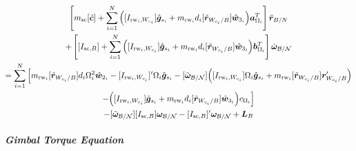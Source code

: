 \begin{multline}
\left[ m_{\text{sc}}[\tilde{\bm c}]+ \sum\limits_{i=1}^{N}\Big([I_{\text{rw}_i,W_{c_i}}]\hat{\bm{g}}_{s_i} + m_{\text{rw}_i}d_i[\tilde{\bm{r}}_{W_{c_i}/B}]\hat{\bm{w}}_{3_i}\Big)\bm{a}_{\Omega_i}^T \right] \ddot{\bm r}_{B/N}
\\ 
+ \left[ [I_{\text{sc},B}] + \sum\limits_{i=1}^{N}\Big([I_{\text{rw}_i,W_{c_i}}]\hat{\bm{g}}_{s_i} + m_{\text{rw}_i}d_i[\tilde{\bm{r}}_{W_{c_i}/B}]\hat{\bm{w}}_{3_i}\Big)\bm{b}_{\Omega_i}^T \right] \dot{\bm\omega}_{\cal B/N} 
\\= 
\sum\limits_{i=1}^{N}\Big[ m_{\text{rw}_i}[\tilde{\bm{r}}_{W_{c_i}/B}]d_i \Omega_i^2\hat{\bm{w}}_{2_i}-[I_{\text{rw}_i,W_{c_i}}]'\Omega_i \hat{\bm{g}}_{s_i} -[\tilde{\bm\omega}_{\cal B/N}]\Big([I_{\text{rw}_i,W_{c_i}}]\Omega_i \hat{\bm{g}}_{s_i}+ m_{\text{rw}_i}[\tilde{\bm{r}}_{W_{c_i}/B}]\bm{r}'_{W_{c_i}/B}\Big) \\ 
-\Big([I_{\text{rw}_i,W_{c_i}}]\hat{\bm{g}}_{s_i} + m_{\text{rw}_i}d_i[\tilde{\bm{r}}_{W_{c_i}/B}]\hat{\bm{w}}_{3_i}\Big)c_{\Omega_i}\Big]
\\  -[\tilde{\bm\omega}_{\cal B/N}][I_{\text{sc},B}]\bm\omega_{\cal B/N}-  [I_{\text{sc},B}]'\bm\omega_{\cal B/N} + \bm{L}_B
\end{multline}

\subparagraph{Gimbal Torque Equation}


